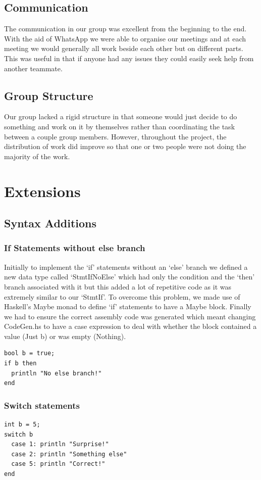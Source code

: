 \documentclass{article}
\begin{document}
\subsection{Communication}
The communication in our group was excellent from the beginning to the end. With the aid of WhatsApp we were able to organise our meetings and at each meeting we would generally all work beside each other but on different parts. This was useful in that if anyone had any issues they could easily seek help from another teammate. 

\subsection{Group Structure}
Our group lacked a rigid structure in that someone would just decide to do something and work on it by themselves rather than coordinating the task between a couple group members. However, throughout the project, the distribution of work did improve so that one or two people were not doing the majority of the work.


\section{Extensions}
\subsection{Syntax Additions}
\subsubsection{If Statements without else branch}
Initially to implement the `if' statements without an `else' branch we defined a new data type called `StmtIfNoElse' which had only the condition and the `then' branch associated with it but this added a lot of repetitive code as it was extremely similar to our `StmtIf'. To overcome this problem, we made use of Haskell's Maybe monad to  define `if' statements to have a Maybe block. Finally we had to ensure the correct assembly code was generated which meant changing CodeGen.hs to have a case expression to deal with whether the block contained a value (Just b) or was empty (Nothing).
\begin{lstlisting}
bool b = true;
if b then
  println "No else branch!"
end
\end{lstlisting}
\subsubsection{Switch statements}
\begin{lstlisting}
int b = 5;
switch b
  case 1: println "Surprise!"
  case 2: println "Something else"
  case 5: println "Correct!"
end
\end{lstlisting}
\end{document}
